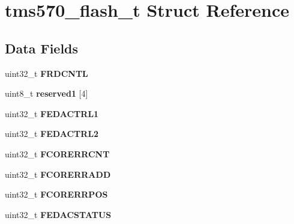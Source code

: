 \hypertarget{structtms570__flash__t}{}\section{tms570\+\_\+flash\+\_\+t Struct Reference}
\label{structtms570__flash__t}
\subsection*{Data Fields}
\begin{DoxyCompactItemize}
\item 
\mbox{\label{structtms570__flash__t_a45e51d79ec3c8ab57ffc122c55d24956}} 
uint32\+\_\+t {\bfseries F\+R\+D\+C\+N\+TL}
\item 
\mbox{\label{structtms570__flash__t_aa87f0951267544e81a2fad6b4a5ca094}} 
uint8\+\_\+t {\bfseries reserved1} \mbox{[}4\mbox{]}
\item 
\mbox{\label{structtms570__flash__t_a0f60e76bbee5392377abd8b7b6fa4c97}} 
uint32\+\_\+t {\bfseries F\+E\+D\+A\+C\+T\+R\+L1}
\item 
\mbox{\label{structtms570__flash__t_a8789e53aa8413117c6d4f750e1688fc6}} 
uint32\+\_\+t {\bfseries F\+E\+D\+A\+C\+T\+R\+L2}
\item 
\mbox{\label{structtms570__flash__t_a074df7c7d111478cdf10e76540fcf068}} 
uint32\+\_\+t {\bfseries F\+C\+O\+R\+E\+R\+R\+C\+NT}
\item 
\mbox{\label{structtms570__flash__t_a22df908e558a40db9bc336a410aaaeab}} 
uint32\+\_\+t {\bfseries F\+C\+O\+R\+E\+R\+R\+A\+DD}
\item 
\mbox{\label{structtms570__flash__t_a9a09bc1d41a0704aac01355ae8a762e8}} 
uint32\+\_\+t {\bfseries F\+C\+O\+R\+E\+R\+R\+P\+OS}
\item 
\mbox{\label{structtms570__flash__t_a41602fb141887ccbf1f6f52f687ce849}} 
uint32\+\_\+t {\bfseries F\+E\+D\+A\+C\+S\+T\+A\+T\+US}
\item 
\mbox{\label{structtms570__flash__t_af652336752160a93db4e2eeb7acc6fe3}} 

\end{DoxyCompactItemize}
